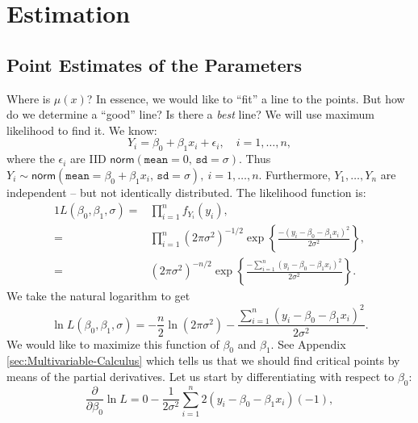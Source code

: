 \documentclass[captions=tableheading]{scrbook}
\begin{document}
\section{Estimation}
\label{sec-1-2}

\label{sec:SLR-Estimation}
\subsection{Point Estimates of the Parameters}
\label{sec-1-2-1}

\label{sub:point-estimate-mle-slr}

Where is \( \mu(x) \)? In essence, we would like to ``fit'' a line to the points. But how do we determine a ``good'' line? Is there a \emph{best} line? We will use maximum likelihood to find it. We know:
\begin{equation}
Y_{i} = \beta_{0} + \beta_{1}x_{i} + \epsilon_{i},\quad i=1,\ldots,n,
\end{equation}
where the \( \epsilon_{i} \) are IID \(\mathsf{norm}(\mathtt{mean}=0,\,\mathtt{sd}=\sigma) \). Thus \( Y_{i}\sim\mathsf{norm}(\mathtt{mean}=\beta_{0}+\beta_{1}x_{i},\,\mathtt{sd}=\sigma),\ i=1,\ldots,n \). Furthermore, \( Y_{1},\ldots,Y_{n} \) are independent -- but not identically distributed. The likelihood function is:
\begin{alignat}{1}
L(\beta_{0},\beta_{1},\sigma)= & \prod_{i=1}^{n}f_{Y_{i}}(y_{i}),\\
= & \prod_{i=1}^{n}(2\pi\sigma^{2})^{-1/2}\exp\left\{ \frac{-(y_{i}-\beta_{0}-\beta_{1}x_{i})^{2}}{2\sigma^{2}}\right\} ,\\
= & (2\pi\sigma^{2})^{-n/2}\exp\left\{ \frac{-\sum_{i=1}^{n}(y_{i}-\beta_{0}-\beta_{1}x_{i})^{2}}{2\sigma^{2}}\right\} .
\end{alignat}
We take the natural logarithm to get
\begin{equation}
\ln L(\beta_{0},\beta_{1},\sigma)=-\frac{n}{2}\ln(2\pi\sigma^{2})-\frac{\sum_{i=1}^{n}(y_{i}-\beta_{0}-\beta_{1}x_{i})^{2}}{2\sigma^{2}}.\label{eq:regML-lnL}
\end{equation}
 We would like to maximize this function of \( \beta_{0} \) and \( \beta_{1} \). See Appendix \ref{sec:Multivariable-Calculus} which tells us that we should find critical points by means of the partial derivatives. Let us start by differentiating with respect to \( \beta_{0} \):
\begin{equation}
\frac{\partial}{\partial\beta_{0}}\ln L=0-\frac{1}{2\sigma^{2}}\sum_{i=1}^{n}2(y_{i}-\beta_{0}-\beta_{1}x_{i})(-1),
\end{equation}
\end{document}
